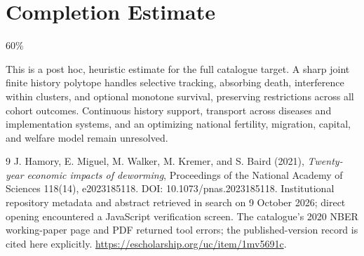 \documentclass[11pt]{article}
\theoremstyle{remark}
\begin{document}
\section{Completion Estimate}
60\%

This is a post hoc, heuristic estimate for the full catalogue target.
A sharp joint finite history polytope handles selective tracking, absorbing death, interference within clusters, and optional monotone survival, preserving restrictions across all cohort outcomes. Continuous history support, transport across diseases and implementation systems, and an optimizing national fertility, migration, capital, and welfare model remain unresolved.

\begin{thebibliography}{9}
 J. Hamory, E. Miguel, M. Walker, M. Kremer, and S. Baird (2021), \emph{Twenty-year economic impacts of deworming}, Proceedings of the National Academy of Sciences 118(14), e2023185118. DOI: 10.1073/pnas.2023185118. Institutional repository metadata and abstract retrieved in search on 9 October 2026; direct opening encountered a JavaScript verification screen. The catalogue's 2020 NBER working-paper page and PDF returned tool errors; the published-version record is cited here explicitly. \url{https://escholarship.org/uc/item/1mv5691c}.
\end{thebibliography}
\end{document}
